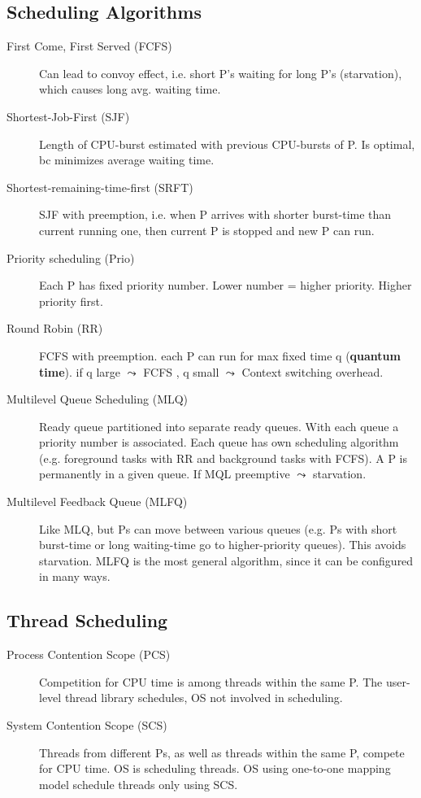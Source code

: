 \subsection*{Scheduling Algorithms}
\begin{description}
  \item[First Come, First Served (FCFS)] Can lead to convoy effect, i.e. short P's waiting for long P's (starvation), which causes long avg. waiting time.
  \item[Shortest-Job-First (SJF)] Length of CPU-burst estimated with previous CPU-bursts of P. Is optimal, bc minimizes average waiting time.
  \item[Shortest-remaining-time-first (SRFT)] SJF with preemption, i.e. when P arrives with shorter burst-time than current running one, then current P is stopped and new P can run.
  \item[Priority scheduling (Prio)] Each P has fixed priority number. Lower number = higher priority. Higher priority first.
  \item[Round Robin (RR)] FCFS with preemption. each P can run for max fixed time q (\textbf{quantum time}). if q large $\leadsto$ FCFS , q small $\leadsto$ Context switching overhead.
  \item[Multilevel Queue Scheduling (MLQ)] Ready queue partitioned into separate ready queues. With each queue a priority number is associated. Each queue has own scheduling algorithm (e.g. foreground tasks with RR and background tasks with FCFS). A P is permanently in a given queue. If MQL preemptive $\leadsto$ starvation.
  \item[Multilevel Feedback Queue (MLFQ)] Like MLQ, but Ps can move between various queues (e.g. Ps with short burst-time or long waiting-time go to higher-priority queues). This avoids starvation. MLFQ is the most general algorithm, since it can be configured in many ways.
\end{description}

\subsection*{Thread Scheduling}
\begin{description}
  \item[Process Contention Scope (PCS)] Competition for CPU time is  among threads within the same P. The user-level thread library schedules, OS not involved in scheduling.
  \item[System Contention Scope (SCS)] Threads from different Ps, as well as threads within the same P, compete for CPU time. OS is scheduling threads. OS using one-to-one mapping model schedule threads only using SCS.
\end{description}
